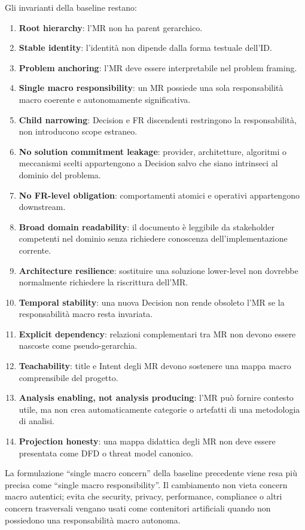\documentclass[12pt,a4paper,oneside]{report}
\begin{document}
Gli invarianti della baseline restano:
\begin{enumerate}
  \item \textbf{Root hierarchy}: l'MR non ha parent gerarchico.
  \item \textbf{Stable identity}: l'identità non dipende dalla forma testuale dell'ID.
  \item \textbf{Problem anchoring}: l'MR deve essere interpretabile nel problem framing.
  \item \textbf{Single macro responsibility}: un MR possiede una sola responsabilità macro coerente e autonomamente significativa.
  \item \textbf{Child narrowing}: Decision e FR discendenti restringono la responsabilità, non introducono scope estraneo.
  \item \textbf{No solution commitment leakage}: provider, architetture, algoritmi o meccanismi scelti appartengono a Decision salvo che siano intrinseci al dominio del problema.
  \item \textbf{No FR-level obligation}: comportamenti atomici e operativi appartengono downstream.
  \item \textbf{Broad domain readability}: il documento è leggibile da stakeholder competenti nel dominio senza richiedere conoscenza dell'implementazione corrente.
  \item \textbf{Architecture resilience}: sostituire una soluzione lower-level non dovrebbe normalmente richiedere la riscrittura dell'MR.
  \item \textbf{Temporal stability}: una nuova Decision non rende obsoleto l'MR se la responsabilità macro resta invariata.
  \item \textbf{Explicit dependency}: relazioni complementari tra MR non devono essere nascoste come pseudo-gerarchia.
  \item \textbf{Teachability}: title e Intent degli MR devono sostenere una mappa macro comprensibile del progetto.
  \item \textbf{Analysis enabling, not analysis producing}: l'MR può fornire contesto utile, ma non crea automaticamente categorie o artefatti di una metodologia di analisi.
  \item \textbf{Projection honesty}: una mappa didattica degli MR non deve essere presentata come DFD o threat model canonico.
\end{enumerate}

\begin{epistemicnote}
La formulazione ``single macro concern'' della baseline precedente viene resa più precisa come ``single macro responsibility''. Il cambiamento non vieta concern macro autentici; evita che security, privacy, performance, compliance o altri concern trasversali vengano usati come contenitori artificiali quando non possiedono una responsabilità macro autonoma.
\end{epistemicnote}
\end{document}

